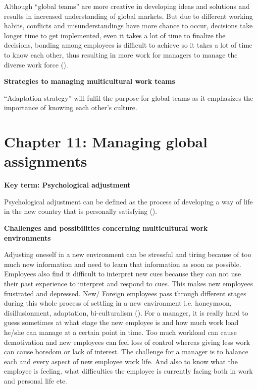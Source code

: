 \documentclass{article}
\begin{document}
Although “global teams” are more creative in developing ideas and solutions and results in increased understanding of global markets. But due to different working habits, conflicts and misunderstandings have more chance to occur, decisions take longer time to get implemented, even it takes a lot of time to finalize the decisions, bonding among employees is difficult to achieve so it takes a lot of time to know each other, thus resulting in more work for managers to manage the diverse work force (\cite[p.~296]{steers2013management}).   

\textbf{Strategies to managing multicultural work teams}

“Adaptation strategy” will fulfil the purpose for global teams as it emphasizes the importance of knowing each other's culture.

\section*{Chapter 11: Managing global assignments}
\textbf{Key term: Psychological adjustment}

Psychological adjustment can be defined as the process of developing a way of life in the new country that is personally satisfying (\cite[p.~342]{steers2013management}). 


\textbf{Challenges and possibilities concerning multicultural work environments}

Adjusting oneself in a new environment can be stressful and tiring because of too much new information and need to learn that information as soon as possible. Employees also find it difficult to interpret new cues because they can not use their past experience to interpret and respond to cues. This makes new employees frustrated and depressed. New/ Foreign employees pass through different stages during this whole process of settling in a new environment i.e. honeymoon, disillusionment, adaptation, bi-culturalism (\cite[p.~345]{steers2013management}). For a manager, it is really hard to guess sometimes at what stage the new employee is and how much work load he/she can manage at a certain point in time. Too much workload can cause demotivation and new employees can feel loss of control whereas giving less work can cause boredom or lack of interest. The challenge for a manager is to balance each and every aspect of new employee work life. And also to know what the employee is feeling, what difficulties the employee is currently facing both in work and personal life etc.  
\end{document}
